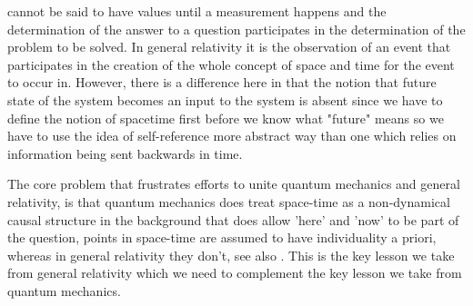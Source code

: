 \documentclass[
   ,final            %
  ]
  {aipproc}
\begin{document}
cannot be said to have values until a measurement happens and the determination of the answer to a question participates in the determination
of the problem to be solved. In general relativity it is the observation of an event that participates in the
creation of the whole concept of space and time for the event to occur in. However, there is a difference here in that the notion that future state of %
the system becomes an input to the system is absent since we have to define the notion of spacetime first before we know what "future" means so we %
have to use the idea of self-reference more abstract way than one which relies on information being sent backwards in time. 
\par
The core problem that frustrates efforts to unite quantum mechanics and general relativity, is that
quantum mechanics does treat space-time as a non-dynamical causal structure in the background that does
allow 'here' and 'now' to be part of the question, points in space-time are assumed to have individuality a
priori, whereas in general relativity they don't, see also \citet{weinstein_2001}. This is the key lesson we take from general relativity which we %
need to complement the key lesson we take from quantum mechanics.
\par
\end{document}
